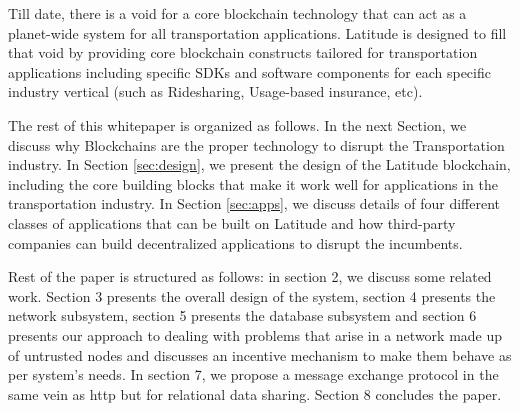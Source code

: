 Till date, there is a void for a core blockchain technology that can act as a planet-wide system for all transportation
applications. Latitude is designed to fill that void by providing core blockchain constructs tailored for transportation
applications including specific SDKs and software components for each specific industry vertical (such as Ridesharing,
Usage-based insurance, etc).

The rest of this whitepaper is organized as follows. In the next Section, we discuss why Blockchains are the proper
technology to disrupt the Transportation industry. In Section \ref{sec:design}, we present the design of the Latitude
blockchain, including the core building blocks that make it work well for applications in the transportation industry.
In Section \ref{sec:apps}, we discuss details of four different classes of applications that can be built on Latitude
and how third-party companies can build decentralized applications to disrupt the incumbents.


%

Rest of the paper is structured as follows: in section 2, we discuss some related work. Section 3 presents the overall
design of the system, section 4 presents the network subsystem, section 5 presents the database subsystem and section 6
presents our approach to dealing with problems that arise in a network made up of untrusted nodes and discusses an
incentive mechanism to make them behave as per system's needs. In section 7, we propose a message exchange protocol in
the same vein as http but for relational data sharing. Section 8 concludes the paper.
